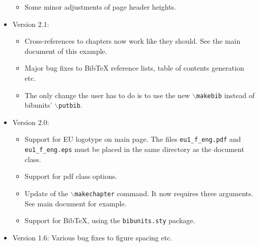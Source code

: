 \begin{itemize}
\begin{itemize}
        \item Some minor adjustments of page header heights.
    \end{itemize}
    \item Version 2.1:
    \begin{itemize}
        \item Cross-references to chapters now work like they
        should. See the main document of this example.
        \item Major bug fixes to BibTeX reference lists, table of
        contents generation etc.
        \item The only change the user has to do is to use the new \texttt{$\backslash$makebib} instead of
        bibunits' \texttt{$\backslash$putbib}.
    \end{itemize}
    \item Version 2.0:
    \begin{itemize}
        \item Support for EU logotype on main page. The files
        \texttt{eu1\_f\_eng.pdf} and\\ \texttt{eu1\_f\_eng.eps} must be
        placed in the same directory as the document class.
        \item Support for pdf class options.
        \item Update of the \texttt{$\backslash$makechapter}
        command. It now requires three arguments. See main
        document for example.
        \item Support for BibTeX, using the \texttt{bibunits.sty}
        package.
    \end{itemize}
    \item Version 1.6: Various bug fixes to figure spacing etc.
\end{itemize}
